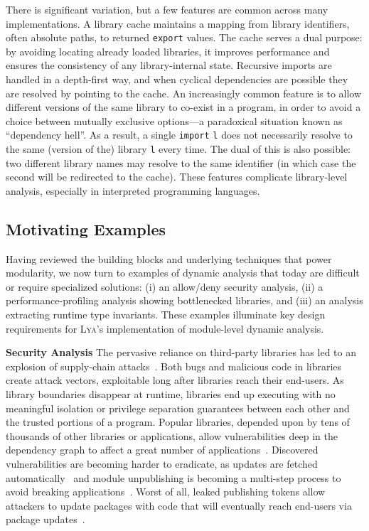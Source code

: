 \documentclass[letterpaper,twocolumn,10pt]{article}
\newcommand{\heading}[1]{\vspace{2pt}\noindent\textbf{#1}\enspace}
\newcommand{\ttt}[1]{\texttt{#1}}
\newcommand{\sys}{{\scshape Lya}\xspace}
\begin{document}
There is significant variation, but a few features are common across many implementations.
A library cache maintains a mapping from library identifiers, often absolute paths, to returned \ttt{export} values.
The cache serves a dual purpose:
  by avoiding locating already loaded libraries, it improves performance and ensures the consistency of any library-internal state.
Recursive imports are handled in a depth-first way, and when cyclical dependencies are possible they are resolved by pointing to the cache.
An increasingly common feature is to allow different versions of the same library to co-exist in a program, in order to avoid a choice between mutually exclusive options---a paradoxical situation known as ``dependency hell''.
As a result, a single \ttt{import} \ttt{l} does not necessarily resolve to the same (version of the) library \ttt{l} every time.
The dual of this is also possible: two different library names may resolve to the same identifier (in which case the second will be redirected to the cache).
These features complicate library-level analysis, especially in interpreted programming languages.



\subsection{Motivating Examples}
\label{examples}

Having reviewed the building blocks and underlying techniques that power modularity, we now turn to examples of dynamic analysis that today are difficult or require specialized solutions:
  (i) an allow/deny security analysis,
  (ii) a performance-profiling analysis showing bottlenecked libraries, and
  (iii) an analysis extracting runtime type invariants.
These examples illuminate key design requirements for \sys's implementation of module-level dynamic analysis.

\heading{Security Analysis}
The pervasive reliance on third-party libraries has led to an explosion of supply-chain attacks~\cite{long2015owasp, maass2016theory, snyk, lauinger2017thou}.
Both bugs and malicious code in libraries create attack vectors, exploitable long after libraries reach their end-users.
As library boundaries disappear at runtime, libraries end up executing with no meaningful isolation or privilege separation guarantees between each other and the trusted portions of a program.
Popular libraries, depended upon by tens of thousands of other libraries or applications, allow vulnerabilities deep in the dependency graph to affect a great number of applications~\cite{leftpad, npmstudy:19}.
Discovered vulnerabilities are becoming harder to eradicate, as updates are fetched automatically~\cite{npmFailure} and module unpublishing is becoming a multi-step process to avoid breaking applications~\cite{npmUnpublish}.
Worst of all, leaked publishing tokens allow attackers to update packages with code that will eventually reach end-users via package updates~\cite{eslint1}.
\end{document}
